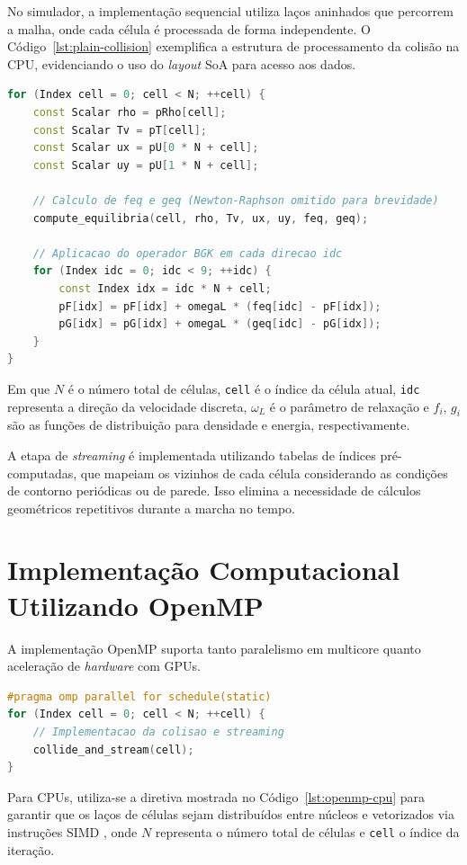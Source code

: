 No simulador, a implementação sequencial utiliza laços aninhados que percorrem a malha, onde cada célula é processada de forma independente.
O Código~\ref{lst:plain-collision} exemplifica a estrutura de processamento da colisão na CPU, evidenciando o uso do \textit{layout} SoA para acesso aos dados.
\begin{lstlisting}[language=C++, caption={Processamento sequencial da colisão e equilíbrio.}, label={lst:plain-collision}, float=ht]
for (Index cell = 0; cell < N; ++cell) {
    const Scalar rho = pRho[cell];
    const Scalar Tv = pT[cell];
    const Scalar ux = pU[0 * N + cell];
    const Scalar uy = pU[1 * N + cell];

    // Calculo de feq e geq (Newton-Raphson omitido para brevidade)
    compute_equilibria(cell, rho, Tv, ux, uy, feq, geq);

    // Aplicacao do operador BGK em cada direcao idc
    for (Index idc = 0; idc < 9; ++idc) {
        const Index idx = idc * N + cell;
        pF[idx] = pF[idx] + omegaL * (feq[idc] - pF[idx]);
        pG[idx] = pG[idx] + omegaL * (geq[idc] - pG[idx]);
    }
}
\end{lstlisting}
Em que $N$ é o número total de células, \texttt{cell} é o índice da célula atual, \texttt{idc} representa a direção da velocidade discreta, $\omega_L$ é o parâmetro de relaxação e $f_i$, $g_i$ são as funções de distribuição para densidade e energia, respectivamente.

A etapa de \textit{streaming} é implementada utilizando tabelas de índices pré-computadas, que mapeiam os vizinhos de cada célula considerando as condições de contorno periódicas ou de parede.
Isso elimina a necessidade de cálculos geométricos repetitivos durante a marcha no tempo.


\section{Implementação Computacional Utilizando OpenMP}\label{sec:implementacao-computacional-utilizando-openmp}

A implementação OpenMP suporta tanto paralelismo em multicore quanto aceleração de \textit{hardware} com GPUs.
\begin{lstlisting}[language=C++, caption={Diretiva de paralelização OpenMP para CPUs multinúcleo.}, label={lst:openmp-cpu}, float=ht]
#pragma omp parallel for schedule(static)
for (Index cell = 0; cell < N; ++cell) {
    // Implementacao da colisao e streaming
    collide_and_stream(cell);
}
\end{lstlisting}
Para CPUs, utiliza-se a diretiva mostrada no Código~\ref{lst:openmp-cpu} para garantir que os laços de células sejam distribuídos entre núcleos e vetorizados via instruções SIMD \parencite{Dagum1998}, onde $N$ representa o número total de células e \texttt{cell} o índice da iteração.

